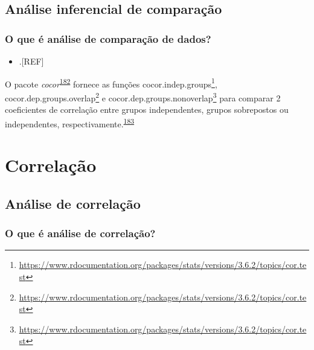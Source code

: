 \documentclass[
  a4paper,
]{book}
\providecommand{\tightlist}{%
  \setlength{\itemsep}{0pt}\setlength{\parskip}{0pt}}
\renewcommand{\href}[2]{#2\footnote{\url{#1}}}
\newenvironment{infobox}[1]
  {
  \begin{itemize}
  \renewcommand{\labelitemi}{
    \raisebox{-.7\height}[0pt][0pt]{
      {\setkeys{Gin}{width=3em,keepaspectratio}
        \texttt{[image: \#1]}}
    }
  }
  \setlength{\fboxsep}{1em}
  \begin{blackbox}
  \item
  }
  {
  \end{blackbox}
  \end{itemize}
  }
\begin{document}
\hypertarget{analise-inferencial-comparacao}{%
\section{Análise inferencial de comparação}\label{analise-inferencial-comparacao}}

\hypertarget{o-que-uxe9-anuxe1lise-de-comparauxe7uxe3o-de-dados}{%
\subsection{O que é análise de comparação de dados?}\label{o-que-uxe9-anuxe1lise-de-comparauxe7uxe3o-de-dados}}

\begin{itemize}
\tightlist
\item
  .{[}REF{]}
\end{itemize}

\begin{infobox}{images/Rlogo}
O pacote \emph{cocor}\textsuperscript{\protect\hyperlink{ref-cocor-4}{182}} fornece as funções \href{https://www.rdocumentation.org/packages/stats/versions/3.6.2/topics/cor.test}{cocor.indep.groups}, \href{https://www.rdocumentation.org/packages/stats/versions/3.6.2/topics/cor.test}{cocor.dep.groups.overlap} e \href{https://www.rdocumentation.org/packages/stats/versions/3.6.2/topics/cor.test}{cocor.dep.groups.nonoverlap} para comparar 2 coeficientes de correlação entre grupos independentes, grupos sobrepostos ou independentes, respectivamente.\textsuperscript{\protect\hyperlink{ref-cocor}{183}}

\end{infobox}

\hypertarget{analise-inferencial-correlacao}{%
\chapter{\texorpdfstring{\textbf{Correlação}}{Correlação}}\label{analise-inferencial-correlacao}}

\hypertarget{analise-correlacao}{%
\section{Análise de correlação}\label{analise-correlacao}}

\hypertarget{o-que-uxe9-anuxe1lise-de-correlauxe7uxe3o}{%
\subsection{O que é análise de correlação?}\label{o-que-uxe9-anuxe1lise-de-correlauxe7uxe3o}}
\end{document}
